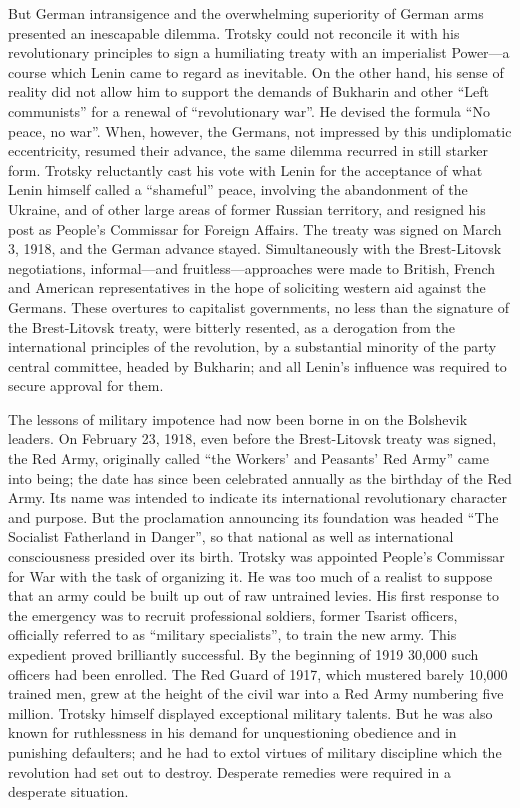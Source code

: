 But German intransigence and the overwhelming superiority of German arms presented an inescapable dilemma. Trotsky could not reconcile it with his revolutionary principles to sign a humiliating treaty with an imperialist Power---a course which Lenin came to regard as inevitable. On the other hand, his sense of reality did not allow him to support the demands of Bukharin and other ``Left communists'' for a renewal of ``revolutionary war''. He devised the formula ``No peace, no war''. When, however, the Germans, not impressed by this undiplomatic eccentricity, resumed their advance, the same dilemma recurred in still starker form. Trotsky reluctantly cast his vote with Lenin for the acceptance of what Lenin himself called a ``shameful'' peace, involving the abandonment of the Ukraine, and of other large areas of former Russian territory, and resigned his post as People's Commissar for Foreign Affairs. The treaty was signed on March 3, 1918, and the German advance stayed. Simultaneously with the Brest-Litovsk negotiations, informal---and fruitless---approaches were made to British, French and American representatives in the hope of soliciting western aid against the Germans. These overtures to capitalist governments, no less than the signature of the Brest-Litovsk treaty, were bitterly resented, as a derogation from the international principles of the revolution, by a substantial minority of the party central committee, headed by Bukharin; and all Lenin's influence was required to secure approval for them. 

The lessons of military impotence had now been borne in on the Bolshevik leaders. On February 23, 1918, even before the Brest-Litovsk treaty was signed, the Red Army, originally called ``the Workers' and Peasants' Red Army'' came into being; the date has since been celebrated annually as the birthday of the Red Army. Its name was intended to indicate its international revolutionary character and purpose. But the proclamation announcing its foundation was headed ``The Socialist Fatherland in Danger'', so that national as well as international consciousness presided over its birth. Trotsky was appointed People's Commissar for War with the task of organizing it. He was too much of a realist to suppose that an army could be built up out of raw untrained levies. His first response to the emergency was to recruit professional soldiers, former Tsarist officers, officially referred to as ``military specialists'', to train the new army. This expedient proved brilliantly successful. By the beginning of 1919 30,000 such officers had been enrolled. The Red Guard of 1917, which mustered barely 10,000 trained men, grew at the height of the civil war into a Red Army numbering five million. Trotsky himself displayed exceptional military talents. But he was also known for ruthlessness in his demand for unquestioning obedience and in punishing defaulters; and he had to extol virtues of military discipline which the revolution had set out to destroy. Desperate remedies were required in a desperate situation. 

